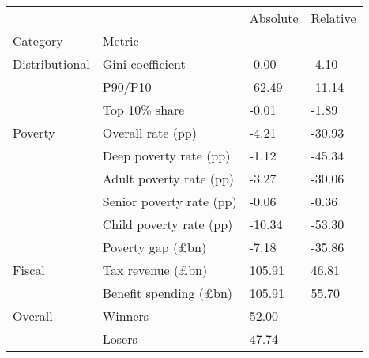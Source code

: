\begin{tabular}{llll}
\toprule
        &        & Absolute & Relative \\
Category & Metric &          &          \\
\midrule
Distributional & Gini coefficient &    -0.00 &    -4.10 \\
        & P90/P10 &   -62.49 &   -11.14 \\
        & Top 10\% share &    -0.01 &    -1.89 \\
Poverty & Overall rate (pp) &    -4.21 &   -30.93 \\
        & Deep poverty rate (pp) &    -1.12 &   -45.34 \\
        & Adult poverty rate (pp) &    -3.27 &   -30.06 \\
        & Senior poverty rate (pp) &    -0.06 &    -0.36 \\
        & Child poverty rate (pp) &   -10.34 &   -53.30 \\
        & Poverty gap (£bn) &    -7.18 &   -35.86 \\
Fiscal & Tax revenue (£bn) &   105.91 &    46.81 \\
        & Benefit spending (£bn) &   105.91 &    55.70 \\
Overall & Winners &    52.00 &        - \\
        & Losers &    47.74 &        - \\
\bottomrule
\end{tabular}
